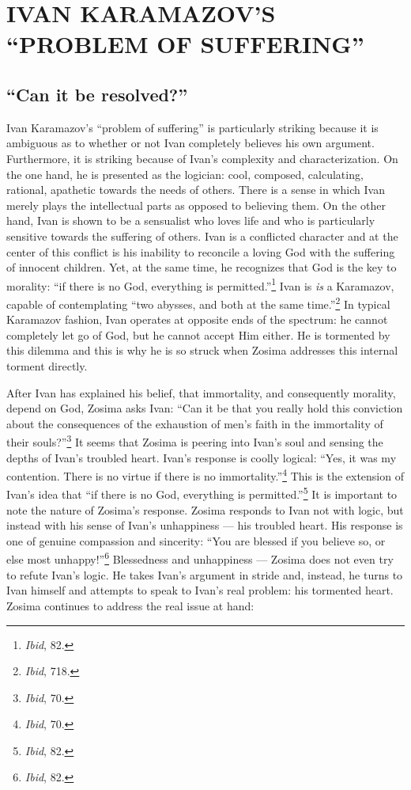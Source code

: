 \chapter{IVAN KARAMAZOV'S ``PROBLEM OF SUFFERING''}
\section{``Can it be resolved?''}
Ivan Karamazov's ``problem of suffering'' is particularly striking because it is ambiguous as to whether or not Ivan completely believes his own argument. Furthermore, it is striking because of Ivan's complexity and characterization. On the one hand, he is presented as the logician: cool, composed, calculating, rational, apathetic towards the needs of others. There is a sense in which Ivan merely plays the intellectual parts as opposed to believing them. On the other hand, Ivan is shown to be a sensualist who loves life and who is particularly sensitive towards the suffering of others. Ivan is a conflicted character and at the center of this conflict is his inability to reconcile a loving God with the suffering of innocent children. Yet, at the same time, he recognizes that God is the key to morality: ``if there is no God, everything is permitted.''\footnote{\emph{Ibid}, 82.} Ivan is \emph{is} a Karamazov, capable of contemplating ``two abysses, and both at the same time.''\footnote{\emph{Ibid}, 718.} In typical Karamazov fashion, Ivan operates at opposite ends of the spectrum: he cannot completely let go of God, but he cannot accept Him either. He is tormented by this dilemma and this is why he is so struck when Zosima addresses this internal torment directly.

After Ivan has explained his belief, that immortality, and consequently morality, depend on God, Zosima asks Ivan: ``Can it be that you really hold this conviction about the consequences of the exhaustion of men's faith in the immortality of their souls?''\footnote{\emph{Ibid}, 70.} It seems that Zosima is peering into Ivan's soul and sensing the depths of Ivan's troubled heart. Ivan's response is coolly logical: ``Yes, it was my contention. There is no virtue if there is no immortality.''\footnote{\emph{Ibid}, 70.} This is the extension of Ivan's idea that ``if there is no God, everything is permitted.''\footnote{\emph{Ibid}, 82.} It is important to note the nature of Zosima's response. Zosima responds to Ivan not with logic, but instead with his sense of Ivan's unhappiness --- his troubled heart. His response is one of genuine compassion and sincerity: ``You are blessed if you believe so, or else most unhappy!''\footnote{\emph{Ibid}, 82.} Blessedness and unhappiness --- Zosima does not even try to refute Ivan's logic. He takes Ivan's argument in stride and, instead, he turns to Ivan himself and attempts to speak to Ivan's real problem: his tormented heart. Zosima continues to address the real issue at hand: 

